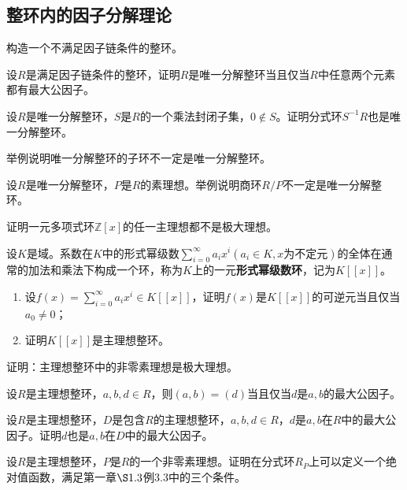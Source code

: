 \subsection{整环内的因子分解理论}
\begin{prob}
构造一个不满足因子链条件的整环。
\end{prob}
\begin{prob}
设$R$是满足因子链条件的整环，证明$R$是唯一分解整环当且仅当$R$中任意两个元素都有最大公因子。
\end{prob}
\begin{prob}
设$R$是唯一分解整环，$S$是$R$的一个乘法封闭子集，$0\notin S$。证明分式环$S^{-1}R$也是唯一分解整环。
\end{prob}
\begin{prob}
举例说明唯一分解整环的子环不一定是唯一分解整环。
\end{prob}
\begin{prob}
设$R$是唯一分解整环，$P$是$R$的素理想。举例说明商环$R/P$不一定是唯一分解整环。
\end{prob}
\begin{prob}
证明一元多项式环$\mathbb{Z}[x]$的任一主理想都不是极大理想。
\end{prob}
\begin{prob}
设$K$是域。系数在$K$中的形式幂级数$\displaystyle \sum_{i=0}^{\infty }a_{i}x^{i}(a_{i}\in K,x\text{为不定元})$的全体在通常的加法和乘法下构成一个环，称为$K$上的一元{\bfseries 形式幂级数环}，记为$K[[x]]$。
\begin{enumerate}[$(1)$]
\item 设$\displaystyle f\left(x\right)=\sum_{i=0}^{\infty }a_{i}x^{i}\in K[[x]]$，证明$f\left(x\right)$是$K[[x]]$的可逆元当且仅当$a_{0}\neq 0$；
\item 证明$K[[x]]$是主理想整环。
\end{enumerate}
\end{prob}
\begin{prob}
证明：主理想整环中的非零素理想是极大理想。
\end{prob}
\begin{prob}
设$R$是主理想整环，$a,b,d\in R$，则$\left(a,b\right)=\left(d\right)$当且仅当$d$是$a,b$的最大公因子。
\end{prob}
\begin{prob}
设$R$是主理想整环，$D$是包含$R$的主理想整环，$a,b,d\in R$，$d$是$a,b$在$R$中的最大公因子。证明$d$也是$a,b$在$D$中的最大公因子。
\end{prob}
\begin{prob}
设$R$是主理想整环，$P$是$R$的一个非零素理想。证明在分式环$R_{P}$上可以定义一个绝对值函数，满足第一章$\S1.3$例$3.3$中的三个条件。
\end{prob}
